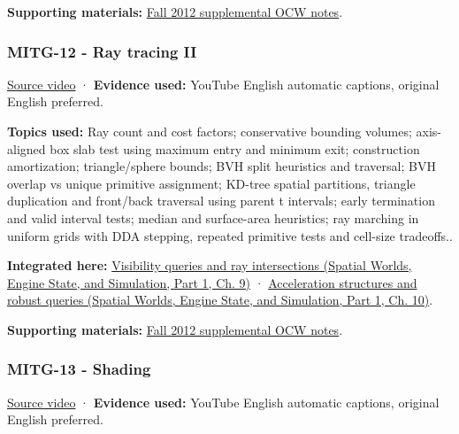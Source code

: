 \textbf{Supporting materials:} \href{https://ocw.mit.edu/courses/6-837-computer-graphics-fall-2012/pages/lecture-notes/}{Fall 2012 supplemental OCW notes}.

\subsubsection{MITG-12 - Ray tracing II}\label{04-visual-computing-ii-ch036-mitg-12---ray-tracing-ii}

\hypertarget{04-visual-computing-ii-ch036-mitg-12---ray-tracing-ii}{}

\href{https://www.youtube.com/watch?v=mr_fHXW2YxE}{Source video} · \textbf{Evidence used:} YouTube English automatic captions, original English preferred.

\textbf{Topics used:} Ray count and cost factors; conservative bounding volumes; axis-aligned box slab test using maximum entry and minimum exit; construction amortization; triangle/sphere bounds; BVH split heuristics and traversal; BVH overlap vs unique primitive assignment; KD-tree spatial partitions, triangle duplication and front/back traversal using parent t intervals; early termination and valid interval tests; median and surface-area heuristics; ray marching in uniform grids with DDA stepping, repeated primitive tests and cell-size tradeoffs..

\textbf{Integrated here:} \href{../05-Spatial-Worlds-Engine-State-and-Simulation-P01/main.pdf\#nameddest=04-visual-computing-ii-ch028-visibility-queries-and-ray-intersections-1}{Visibility queries and ray intersections (Spatial Worlds, Engine State, and Simulation, Part 1, Ch. 9)} · \href{../05-Spatial-Worlds-Engine-State-and-Simulation-P01/main.pdf\#nameddest=04-visual-computing-ii-ch029-acceleration-structures-and-robust-queries-1}{Acceleration structures and robust queries (Spatial Worlds, Engine State, and Simulation, Part 1, Ch. 10)}.

\textbf{Supporting materials:} \href{https://ocw.mit.edu/courses/6-837-computer-graphics-fall-2012/pages/lecture-notes/}{Fall 2012 supplemental OCW notes}.

\subsubsection{MITG-13 - Shading}\label{04-visual-computing-ii-ch036-mitg-13---shading}

\hypertarget{04-visual-computing-ii-ch036-mitg-13---shading}{}

\href{https://www.youtube.com/watch?v=0xmeaXs5-ZU}{Source video} · \textbf{Evidence used:} YouTube English automatic captions, original English preferred.

